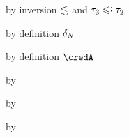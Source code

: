 {\begin{lamportproof*}
    \begin{pfproof}
        \begin{pfproof}
          by inversion $\lesssim$ and $\stype_3 \subteq \stype_2$
        \end{pfproof}
        \begin{pfproof}
          by definition $\delta_{N}$
        \end{pfproof}
        \begin{pfproof}
          by definition $\credA$
        \end{pfproof}
      \qedstep
        \begin{pfproof}
          by 
        \end{pfproof}
    \end{pfproof}

    \begin{pfproof}
      \absurdstep
        \begin{pfproof}
          by 
        \end{pfproof}
    \end{pfproof}

    \begin{pfproof}
      \absurdstep
        \begin{pfproof}
          by 
        \end{pfproof}
    \end{pfproof}


\end{lamportproof*}}
